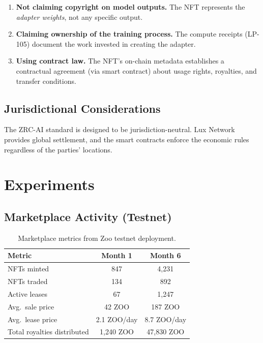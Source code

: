 \documentclass[11pt,letterpaper]{article}
\begin{document}
\begin{enumerate}
    \item \textbf{Not claiming copyright on model outputs.} The NFT represents the \emph{adapter weights}, not any specific output.
    \item \textbf{Claiming ownership of the training process.} The compute receipts (LP-105) document the work invested in creating the adapter.
    \item \textbf{Using contract law.} The NFT's on-chain metadata establishes a contractual agreement (via smart contract) about usage rights, royalties, and transfer conditions.
\end{enumerate}

\subsection{Jurisdictional Considerations}

The ZRC-AI standard is designed to be jurisdiction-neutral. Lux Network provides global settlement, and the smart contracts enforce the economic rules regardless of the parties' locations.

\section{Experiments}

\subsection{Marketplace Activity (Testnet)}

\begin{table}[t]
\centering
\begin{tabular}{lcc}
\toprule
\textbf{Metric} & \textbf{Month 1} & \textbf{Month 6} \\
\midrule
NFTs minted & 847 & 4,231 \\
NFTs traded & 134 & 892 \\
Active leases & 67 & 1,247 \\
Avg.\ sale price & 42 ZOO & 187 ZOO \\
Avg.\ lease price & 2.1 ZOO/day & 8.7 ZOO/day \\
Total royalties distributed & 1,240 ZOO & 47,830 ZOO \\
\bottomrule
\end{tabular}
\caption{Marketplace metrics from Zoo testnet deployment.}
\label{tab:marketplace}
\end{table}
\end{document}
